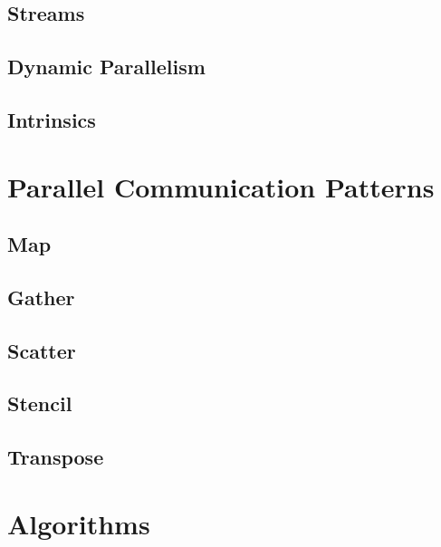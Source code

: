 \documentclass[12px,oz]{report}
\begin{document}
	\section{Streams}
	\label{sec-pm-streams}
		
	
	\section{Dynamic Parallelism}
	\label{sec-pm-dynamic}
	
	
	\section{Intrinsics}
	\label{sec-pm-intrinsics}
	


\chapter{Parallel Communication Patterns}
\label{ch-patterns}

	
	\section{Map}
	\label{sec-map}
	
	
	\section{Gather}
	\label{sec-gather}
	
	
	\section{Scatter}
	\label{sec-scatter}
	
	
	\section{Stencil}
	\label{sec-stencil}
	
	
	\section{Transpose}
	\label{sec-transpose}
	
	
\chapter{Algorithms}
\label{ch:algorithms}

\end{document}

